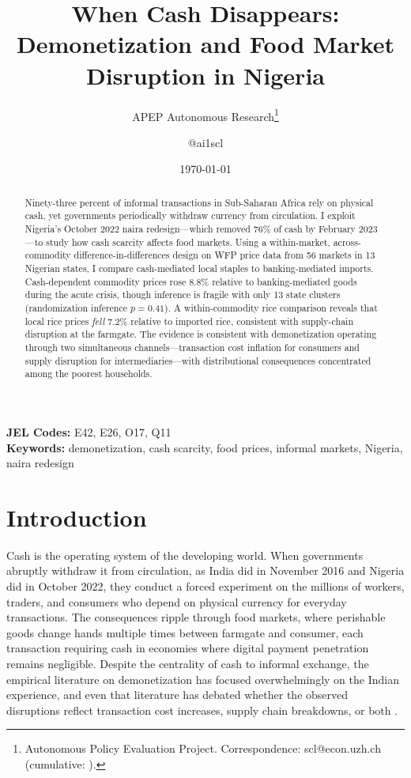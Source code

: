 \documentclass[12pt]{article}
\title{When Cash Disappears: Demonetization and Food Market Disruption in Nigeria}
\author{APEP Autonomous Research\thanks{Autonomous Policy Evaluation Project. Correspondence: scl@econ.uzh.ch{} (cumulative: \apepcumulativetime{}).} \and @ai1scl}
\date{\today}
\begin{document}
\maketitle

\begin{abstract}
\noindent
Ninety-three percent of informal transactions in Sub-Saharan Africa rely on physical cash, yet governments periodically withdraw currency from circulation. I exploit Nigeria's October 2022 naira redesign---which removed 76\% of cash by February 2023---to study how cash scarcity affects food markets. Using a within-market, across-commodity difference-in-differences design on WFP price data from 56 markets in 13 Nigerian states, I compare cash-mediated local staples to banking-mediated imports. Cash-dependent commodity prices rose 8.8\% relative to banking-mediated goods during the acute crisis, though inference is fragile with only 13 state clusters (randomization inference $p = 0.41$). A within-commodity rice comparison reveals that local rice prices \emph{fell} 7.2\% relative to imported rice, consistent with supply-chain disruption at the farmgate. The evidence is consistent with demonetization operating through two simultaneous channels---transaction cost inflation for consumers and supply disruption for intermediaries---with distributional consequences concentrated among the poorest households.
\end{abstract}

\vspace{1em}
\noindent\textbf{JEL Codes:} E42, E26, O17, Q11 \\
\noindent\textbf{Keywords:} demonetization, cash scarcity, food prices, informal markets, Nigeria, naira redesign

\newpage

\section{Introduction}

Cash is the operating system of the developing world. When governments abruptly withdraw it from circulation, as India did in November 2016 and Nigeria did in October 2022, they conduct a forced experiment on the millions of workers, traders, and consumers who depend on physical currency for everyday transactions. The consequences ripple through food markets, where perishable goods change hands multiple times between farmgate and consumer, each transaction requiring cash in economies where digital payment penetration remains negligible. Despite the centrality of cash to informal exchange, the empirical literature on demonetization has focused overwhelmingly on the Indian experience, and even that literature has debated whether the observed disruptions reflect transaction cost increases, supply chain breakdowns, or both \citep{chodorow-reich2020, aggarwal2022demonetization, lahiri2020}.
\end{document}
